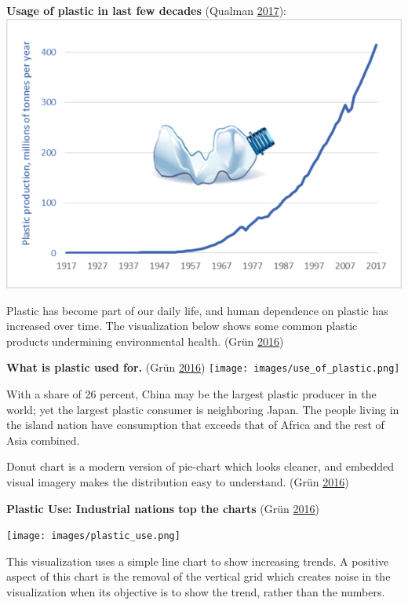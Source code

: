 \documentclass[]{book}
\begin{document}
\textbf{Usage of plastic in last few decades} (Qualman \protect\hyperlink{ref-global_plastic_production}{2017}):
\includegraphics{images/Global-plastic-production-1917-to-2017.png}

Plastic has become part of our daily life, and human dependence on plastic has increased over time. The visualization below shows some common plastic products undermining environmental health. (Grün \protect\hyperlink{ref-plastic_pollution_visualizations}{2016})

\textbf{What is plastic used for.} (Grün \protect\hyperlink{ref-plastic_pollution_visualizations}{2016})
\texttt{[image: images/use\_of\_plastic.png]}

With a share of 26 percent, China may be the largest plastic producer in the world; yet the largest plastic consumer is neighboring Japan. The people living in the island nation have consumption that exceeds that of Africa and the rest of Asia combined.

Donut chart is a modern version of pie-chart which looks cleaner, and embedded visual imagery makes the distribution easy to understand.
(Grün \protect\hyperlink{ref-plastic_pollution_visualizations}{2016})

\textbf{Plastic Use: Industrial nations top the charts} (Grün \protect\hyperlink{ref-plastic_pollution_visualizations}{2016})

\texttt{[image: images/plastic\_use.png]}

This visualization uses a simple line chart to show increasing trends. A positive aspect of this chart is the removal of the vertical grid which creates noise in the visualization when its objective is to show the trend, rather than the numbers.
\end{document}
